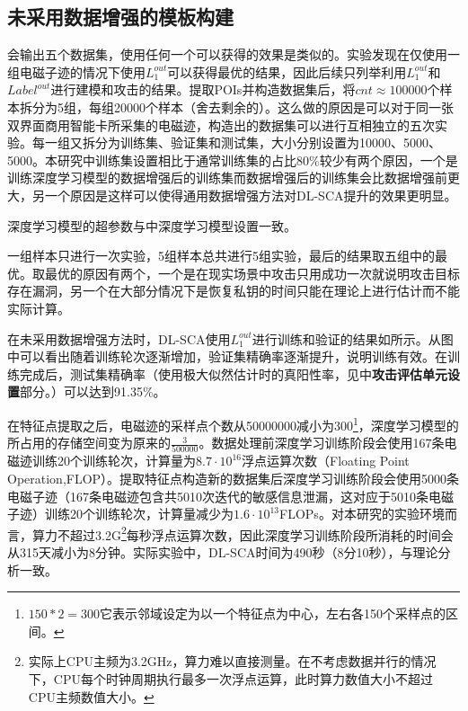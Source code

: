 {{	\subsection{未采用数据增强的模板构建}
	会输出五个数据集，使用任何一个可以获得的效果是类似的。实验发现在仅使用一组电磁子迹的情况下使用$L_1^{out}$可以获得最优的结果，因此后续只列举利用$L_1^{out}$和$Label^{out}$进行建模和攻击的结果。提取POIs并构造数据集后，将$cnt\approx100000$个样本拆分为5组，每组20000个样本（舍去剩余的）。这么做的原因是可以对于同一张双界面商用智能卡所采集的电磁迹，构造出的数据集可以进行互相独立的五次实验。每一组又拆分为训练集、验证集和测试集，大小分别设置为10000、5000、5000。本研究中训练集设置相比于通常训练集的占比80\%较少有两个原因，一个是训练深度学习模型的数据增强后的训练集而数据增强后的训练集会比数据增强前更大，另一个原因是这样可以使得通用数据增强方法对DL-SCA提升的效果更明显。
	
	深度学习模型的超参数与中深度学习模型设置一致。
	
	一组样本只进行一次实验，5组样本总共进行5组实验，最后的结果取五组中的最优。取最优的原因有两个，一个是在现实场景中攻击只用成功一次就说明攻击目标存在漏洞，另一个在大部分情况下是恢复私钥的时间只能在理论上进行估计而不能实际计算。
	
	在未采用数据增强方法时，DL-SCA使用$L_1^{out}$进行训练和验证的结果如所示。从图中可以看出随着训练轮次逐渐增加，验证集精确率逐渐提升，说明训练有效。在训练完成后，测试集精确率（使用极大似然估计时的真阳性率，见中\textbf{攻击评估单元设置}部分。）可以达到91.35\%。%
	
	在特征点提取之后，电磁迹的采样点个数从50000000减小为300\footnote{$150*2=300$它表示邻域设定为以一个特征点为中心，左右各150个采样点的区间。}，深度学习模型的所占用的存储空间变为原来的$\frac{3}{500000}$。数据处理前深度学习训练阶段会使用167条电磁迹训练20个训练轮次，计算量为$8.7\cdot10^{16}$浮点运算次数（Floating Point Operation,FLOP）。提取特征点构造新的数据集后深度学习训练阶段会使用5000条电磁子迹（167条电磁迹包含共5010次迭代的敏感信息泄漏，这对应于5010条电磁子迹）训练20个训练轮次，计算量减少为$1.6\cdot10^{13}$FLOPs。对本研究的实验环境而言，算力不超过3.2G\footnote{实际上CPU主频为3.2GHz，算力难以直接测量。在不考虑数据并行的情况下，CPU每个时钟周期执行最多一次浮点运算，此时算力数值大小不超过CPU主频数值大小。}每秒浮点运算次数，因此深度学习训练阶段所消耗的时间会从315天减小为8分钟。实际实验中，DL-SCA时间为490秒（8分10秒），与理论分析一致。%
	
}}
